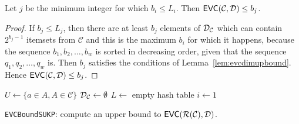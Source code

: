 \begin{lemma}\label{lem:sukpevc}
  Let $j$ be the minimum integer for which $b_i\le L_i$. Then
  $\mathsf{EVC}(\mathcal{C},{\cal D})\le b_j$.
\end{lemma}
\begin{proof}
  If $b_j\le L_j$, then there are at least $b_j$ elements of ${\cal D}_\mathcal{C}$
  which can contain $2^{b_j-1}$ itemsets from $\mathcal{C}$ and this is the
  maximum $b_i$ for which it happens, because the sequence $b_1,b_2,\dotsc,b_w$
  is sorted in decreasing order, given that the sequence $q_1,q_2,\dotsc,q_w$
  is. Then $b_j$ satisfies the conditions of Lemma~\ref{lem:evcdimupbound}.
  Hence $\mathsf{EVC}(\mathcal{C},{\cal D})\le b_j$.
\end{proof}

\begin{algorithm}[htbp]
  \DontPrintSemicolon
  $U\leftarrow\{a\in A, A\in\mathcal{C}\}$\;
  ${\cal D}_\mathcal{C}\leftarrow\emptyset$\;
  $L\leftarrow$ empty hash table\;
  $i\leftarrow 1$\;
  \;
  \caption{\texttt{EVCBoundSUKP}: compute an upper bound to
  $\mathsf{EVC}(\mathcal{R}(\mathcal{C}),{\cal D})$.}
  \label{alg:evcboundsukp}
\end{algorithm}

